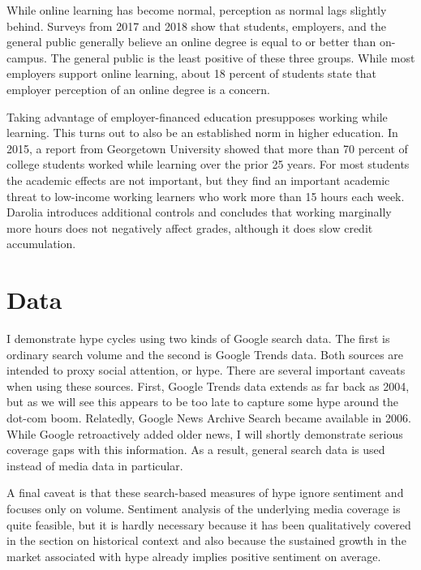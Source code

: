 \documentclass[review]{elsarticle}
\begin{document}
    While online learning has become normal, perception as normal lags slightly behind.
    Surveys from 2017 and 2018 show that students, employers, and the general public generally believe
    an online degree is equal to or better than on-campus\cite{venable_2019}.
    The general public is the least positive of these three groups.
    While most employers support online learning,
    about 18 percent of students state that employer perception of an online degree is a concern.

    Taking advantage of employer-financed education presupposes working while learning.
    This turns out to also be an established norm in higher education.
    In 2015, a report from Georgetown University showed that more than 70 percent of college students
    worked while learning over the prior 25 years\cite{carnevale2015learning}.
    For most students the academic effects are not important,
    but they find an important academic threat to low-income working learners who work more than 15 hours each week.
    Darolia\cite{darolia2014working} introduces additional controls and concludes that working
    marginally more hours does not negatively affect grades, although it does slow credit accumulation.

    \section{Data}

    I demonstrate hype cycles using two kinds of Google search data.
    The first is ordinary search volume and the second is Google Trends data.
    Both sources are intended to proxy social attention, or hype.
    There are several important caveats when using these sources.
    First, Google Trends data extends as far back as 2004, but as we will see this appears to be too late to capture some hype around the dot-com boom.
    Relatedly, Google News Archive Search became available in 2006.
    While Google retroactively added older news, I will shortly demonstrate serious coverage gaps with this information.
    As a result, general search data is used instead of media data in particular.

    A final caveat is that these search-based measures of hype ignore sentiment and focuses only on volume.
    Sentiment analysis of the underlying media coverage is quite feasible,
    but it is hardly necessary because it has been qualitatively covered in the section on historical context
    and also because the sustained growth in the market associated with hype already implies positive sentiment on average.
\end{document}
